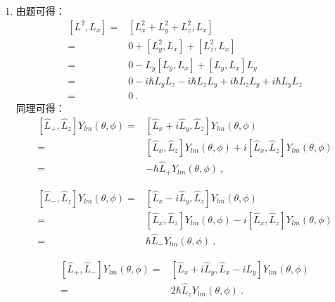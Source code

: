 \begin{enumerate}
\item 由题可得：
\begin{equation}
\begin{aligned}
\left[L^{2},L_{x}\right] =& [ L^{2}_{x} + L^{2}_{y} + L^{2}_{z} , L_{x}] \\
=& 0 + [L^{2}_{y},L_{x}] + [L^{2}_{z},L_{x}] \\
=& 0 - L_y[L_y,L_x]+[L_y,L_x]L_y \\
=& 0 - i\hbar L_y L_z - i\hbar L_z L_y + i\hbar L_z L_y + i\hbar L_y L_z \\
=& 0~.
\end{aligned}
\end{equation}
同理可得：
\begin{equation}
\begin{aligned}
\left[\hat{L}_+,\hat{L}_z\right]Y_{lm}(\theta ,\phi) =& \left[\hat{L}_{x}+i\hat{L}_{y} ,\hat{L}_z \right]Y_{lm}(\theta ,\phi) \\
=& \left[\hat{L}_x ,\hat{L}_z \right]Y_{lm}(\theta ,\phi) + i\left[\hat{L}_x ,\hat{L}_z \right]Y_{lm}(\theta ,\phi) \\
=& -\hbar \hat{L}_{+}Y_{lm}(\theta ,\phi)~,
\end{aligned}
\end{equation}

\begin{equation}
\begin{aligned}
\left[\hat{L}_{-},\hat{L}_{z}\right]Y_{lm}(\theta ,\phi) =& \left[\hat{L}_{x}-i\hat{L}_{y} ,\hat{L}_z \right]Y_{lm}(\theta ,\phi) \\
=& \left[\hat{L}_x ,\hat{L}_z \right]Y_{lm}(\theta ,\phi) - i\left[\hat{L}_x ,\hat{L}_z \right]Y_{lm}(\theta ,\phi) \\
=& \hbar \hat{L}_{-}Y_{lm}(\theta ,\phi)~,
\end{aligned}
\end{equation}

\begin{equation}
\begin{aligned}
\left[\hat{L}_{+},\hat{L}_{-}\right]Y_{lm}(\theta ,\phi) =& \left[\hat{L}_{x} + i\hat{L}_{y} ,\hat{L}_{x}-i\hat{L}_{y} \right]Y_{lm}(\theta ,\phi) \\
=& 2\hbar \hat{L}_{z}Y_{lm}(\theta ,\phi)~.
\end{aligned}
\end{equation}


\end{enumerate}
